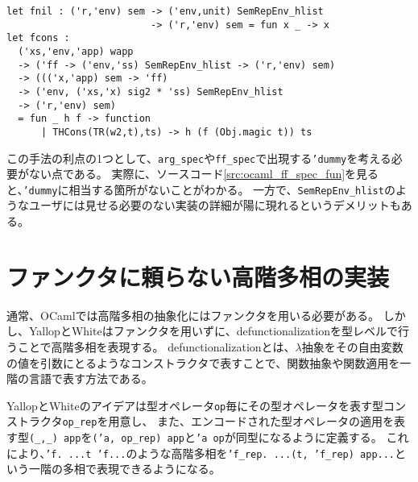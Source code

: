 \documentclass[uplatex]{sumiilab-paper}
\theoremstyle{mystyle}
\numberwithin{definition}{chapter} %
\begin{document}
\begin{lstlisting}[caption=ff\_specを表すtype-indexed value,label=src:ocaml_ff_spec_fun]
let fnil : ('r,'env) sem -> ('env,unit) SemRepEnv_hlist 
                         -> ('r,'env) sem = fun x _ -> x 
let fcons : 
  ('xs,'env,'app) wapp 
  -> ('ff -> ('env,'ss) SemRepEnv_hlist -> ('r,'env) sem)
  -> ((('x,'app) sem -> 'ff) 
  -> ('env, ('xs,'x) sig2 * 'ss) SemRepEnv_hlist 
  -> ('r,'env) sem) 
  = fun _ h f -> function 
      | THCons(TR(w2,t),ts) -> h (f (Obj.magic t)) ts
\end{lstlisting}

この手法の利点の1つとして、{\tt arg\_spec}や{\tt ff\_spec}で出現する{\tt 'dummy}を考える必要がない点である。
実際に、ソースコード\ref{src:ocaml_ff_spec_fun}を見ると、{\tt 'dummy}に相当する箇所がないことがわかる。
一方で、{\tt SemRepEnv\_hlist}のようなユーザには見せる必要のない実装の詳細が陽に現れるというデメリットもある。

\section{ファンクタに頼らない高階多相の実装}
通常、OCamlでは高階多相の抽象化にはファンクタを用いる必要がある。
しかし、YallopとWhiteはファンクタを用いずに、defunctionalizationを型レベルで行うことで高階多相を表現する\cite{hkp_yallop}。
defunctionalizationとは、$\lambda$抽象をその自由変数の値を引数にとるようなコンストラクタで表すことで、関数抽象や関数適用を一階の言語で表す方法である\cite{def_1, def_2}。

YallopとWhiteのアイデアは型オペレータ{\tt op}毎にその型オペレータを表す型コンストラクタ{\tt op\_rep}を用意し、
また、エンコードされた型オペレータの適用を表す型{\tt (\_,\_) app}を{\tt ('a, op\_rep) app}と{\tt 'a op}が同型になるように定義する。
これにより、{\tt 'f. ...t 'f...}のような高階多相を{\tt 'f\_rep. ...(t, 'f\_rep) app...}という一階の多相で表現できるようになる。 
\end{document}
